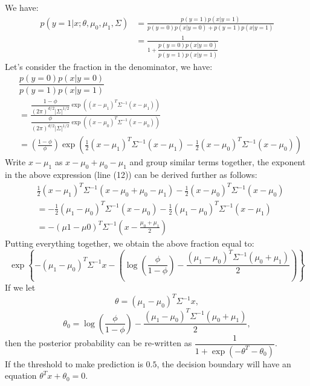 \begin{answer}	
We have:
%
\begin{align}
	p(y = 1|x; \theta, \mu_0, \mu_1, \Sigma)
	&= \frac{p(y =1)p(x|y = 1)}{p(y = 0)p(x|y = 0) + p(y=1)p(x|y = 1)} \\
	&= \frac{1}{1 + \dfrac{p(y = 0)p(x|y = 0)}{p(y=1)p(x|y = 1)}}
\end{align}
%
Let's consider the fraction in the denominator, we have:
%
\begin{align}
	& \dfrac{p(y = 0)p(x|y = 0)}{p(y=1)p(x|y = 1)} \\
	&= \frac{\dfrac{1 - \phi}{(2\pi)^{d/2}|\Sigma|^{1/2}} \exp((x - \mu_1)^T \Sigma^{-1} (x - \mu_1))}{\dfrac{\phi}{(2\pi)^{d/2}|\Sigma|^{1/2}} \exp((x - \mu_0)^T \Sigma^{-1} (x - \mu_0))} \\
	&= \left(\frac{1 - \phi}{\phi}\right) \exp\left( \frac{1}{2} (x - \mu_1)^T \Sigma^{-1} (x - \mu_1) - \frac{1}{2} (x - \mu_0)^T \Sigma^{-1} (x - \mu_0) \right)
\end{align}
% 
Write $x - \mu_1$ as $x - \mu_0 + \mu_0 - \mu_1$ and group similar terms together, the exponent in the above expression (line (12)) can be derived further as follows:
%
\begin{align}
& \frac{1}{2} (x - \mu_1)^T \Sigma^{-1} (x - \mu_0 + \mu_0 - \mu_1) - \frac{1}{2} (x - \mu_0)^T \Sigma^{-1} (x - \mu_0) \\
&= -\frac{1}{2} (\mu_1 - \mu_0)^T \Sigma^{-1} (x - \mu_0) - \frac{1}{2} (\mu_1 - \mu_0)^T \Sigma^{-1} (x - \mu_1) \\
&= -(\mu1 - \mu0)^T \Sigma^{-1} (x - \frac{\mu_0 + \mu_1}{2})
\end{align}
%
Putting everything together, we obtain the above fraction equal to:
$$ \exp\left\{-(\mu_1 - \mu_0)^T \Sigma^{-1}x - \left( \log \left( \frac{\phi}{1 - \phi} \right) - \frac{(\mu_1 - \mu_0)^T \Sigma^{-1} (\mu_0 + \mu_1)}{2} \right) \right\} $$
If we let $$\theta = (\mu_1 - \mu_0)^T \Sigma^{-1}x,$$ $$\theta_0 = \log \left( \dfrac{\phi}{1 - \phi} \right) - \dfrac{(\mu_1 - \mu_0)^T \Sigma^{-1} (\mu_0 + \mu_1)}{2},$$ then the posterior probability can be re-written as $\dfrac{1}{1 + \exp(-\theta^T - \theta_0)}$. \\[2pt]
If the threshold to make prediction is $0.5$, the decision boundary will have an equation $\theta^T x + \theta_0 = 0$. \\
\end{answer}
